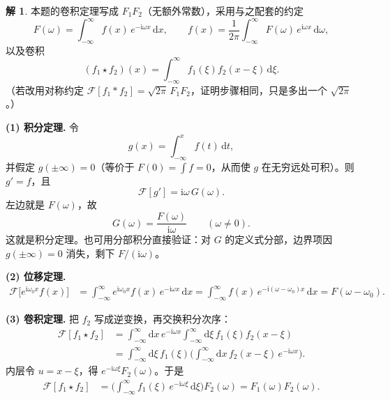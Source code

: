 \documentclass[11pt]{article}
\theoremstyle{remark}
\theoremstyle{definition}
\newtheorem{solution}{解}
\begin{document}
\begin{solution}
本题的卷积定理写成 $F_1 F_2$（无额外常数），采用与之配套的约定
\begin{equation}
F(\omega)
=\int_{-\infty}^{\infty}f(x)\,e^{-\mathrm{i}\omega x}\,\mathrm{d}x,
\qquad
f(x)
=\frac{1}{2\pi}
\int_{-\infty}^{\infty}F(\omega)\,e^{\mathrm{i}\omega x}\,\mathrm{d}\omega,
\label{eq:hw6-ft-asym}
\end{equation}
以及卷积
\[
(f_1\star f_2)(x)
=\int_{-\infty}^{\infty}f_1(\xi)f_2(x-\xi)\,\mathrm{d}\xi.
\]
（若改用对称约定 $\mathcal{F}[f_1*f_2]=\sqrt{2\pi}\,F_1 F_2$，证明步骤相同，只是多出一个 $\sqrt{2\pi}$。）

\medskip
\noindent\textbf{(1) 积分定理.}
令
\[
g(x)=\int_{-\infty}^{x}f(t)\,\mathrm{d}t,
\]
并假定 $g(\pm\infty)=0$（等价于 $F(0)=\int f=0$，从而使 $g$ 在无穷远处可积）。则 $g'=f$，且
\[
\mathcal{F}[g']=\mathrm{i}\omega\,G(\omega).
\]
左边就是 $F(\omega)$，故
\[
G(\omega)=\frac{F(\omega)}{\mathrm{i}\omega}
\qquad(\omega\neq 0).
\]
这就是积分定理。也可用分部积分直接验证：对 $G$ 的定义式分部，边界项因 $g(\pm\infty)=0$ 消失，剩下 $F/(\mathrm{i}\omega)$。

\medskip
\noindent\textbf{(2) 位移定理.}
\begin{align*}
\mathcal{F}\bigl[e^{\mathrm{i}\omega_0 x}f(x)\bigr]
&=\int_{-\infty}^{\infty}
  e^{\mathrm{i}\omega_0 x}f(x)\,e^{-\mathrm{i}\omega x}\,\mathrm{d}x
=\int_{-\infty}^{\infty}
  f(x)\,e^{-\mathrm{i}(\omega-\omega_0)x}\,\mathrm{d}x
=F(\omega-\omega_0).
\end{align*}

\medskip
\noindent\textbf{(3) 卷积定理.}
把 $f_2$ 写成逆变换，再交换积分次序：
\begin{align*}
\mathcal{F}[f_1\star f_2]
&=\int_{-\infty}^{\infty}\mathrm{d}x\,e^{-\mathrm{i}\omega x}
  \int_{-\infty}^{\infty}\mathrm{d}\xi\,
  f_1(\xi)f_2(x-\xi)\\
&=\int_{-\infty}^{\infty}\mathrm{d}\xi\,f_1(\xi)
  \Biggl(
    \int_{-\infty}^{\infty}\mathrm{d}x\,
    f_2(x-\xi)\,e^{-\mathrm{i}\omega x}
  \Biggr).
\end{align*}
内层令 $u=x-\xi$，得 $e^{-\mathrm{i}\omega\xi}F_2(\omega)$。于是
\begin{align*}
\mathcal{F}[f_1\star f_2]
&=\Biggl(\int_{-\infty}^{\infty}f_1(\xi)\,e^{-\mathrm{i}\omega\xi}\,\mathrm{d}\xi\Biggr)
  F_2(\omega)
=F_1(\omega)F_2(\omega).
\end{align*}
\end{solution}
\end{document}
